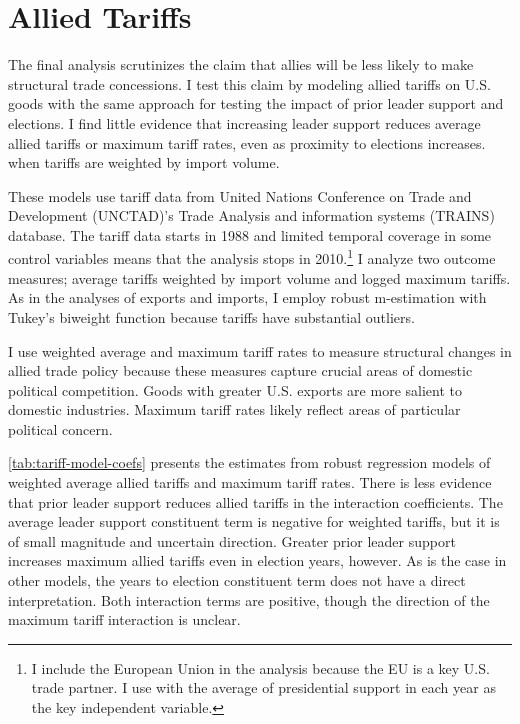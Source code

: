 \documentclass[12pt]{article}
\begin{document}
\section{Allied Tariffs} 


The final analysis scrutinizes the claim that allies will be less likely to make structural trade concessions. 
I test this claim by modeling allied tariffs on U.S. goods with the same approach for testing the impact of prior leader support and elections. 
I find little evidence that increasing leader support reduces average allied tariffs or maximum tariff rates, even as proximity to elections increases. when tariffs are weighted by import volume. 


These models use tariff data from United Nations Conference on Trade and Development (UNCTAD)'s Trade Analysis and information systems (TRAINS) database. 
The tariff data starts in 1988 and limited temporal coverage in some control variables means that the analysis stops in 2010.\footnote{I include the European Union in the analysis because the EU is a key U.S. trade partner. I use with the average of presidential support in each year as the key independent variable.}
I analyze two outcome measures; average tariffs weighted by import volume and logged maximum tariffs. 
As in the analyses of exports and imports, I employ robust m-estimation with Tukey's biweight function because tariffs have substantial outliers.


I use weighted average and maximum tariff rates to measure structural changes in allied trade policy because these measures capture crucial areas of domestic political competition.
Goods with greater U.S. exports are more salient to domestic industries. 
Maximum tariff rates likely reflect areas of particular political concern.


\autoref{tab:tariff-model-coefs} presents the estimates from robust regression models of weighted average allied tariffs and maximum tariff rates. 
There is less evidence that prior leader support reduces allied tariffs in the interaction coefficients. 
The average leader support constituent term is negative for weighted tariffs, but it is of small magnitude and uncertain direction.
Greater prior leader support increases maximum allied tariffs even in election years, however.
As is the case in other models, the years to election constituent term does not have a direct interpretation.
Both interaction terms are positive, though the direction of the maximum tariff interaction is unclear. 
\end{document}
